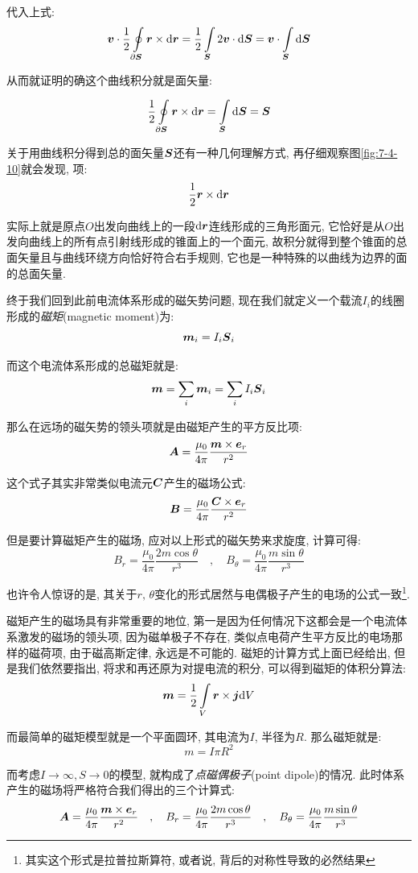 代入上式:
\[\boldsymbol{v}\cdot\frac{1}{2}\oint\limits_{\partial\boldsymbol{S}}\boldsymbol{r}\times \textrm{d} \boldsymbol{r}=\frac{1}{2}\int\limits_{\boldsymbol{S}}2\boldsymbol{v} \cdot \textrm{d} \boldsymbol{S}=\boldsymbol{v} \cdot\int\limits_{\boldsymbol{S}}\textrm{d} \boldsymbol{S}\]

从而就证明的确这个曲线积分就是面矢量:

\[\frac{1}{2}\oint\limits_{\partial\boldsymbol{S}}\boldsymbol{r}\times \textrm{d} \boldsymbol{r}=\int\limits_{\boldsymbol{S}}\textrm{d} \boldsymbol{S}=\boldsymbol{S}\]

关于用曲线积分得到总的面矢量$\boldsymbol{S}$还有一种几何理解方式, 再仔细观察图\ref{fig:7-4-10}就会发现, 项:
\[\frac{1}{2}\boldsymbol{r}\times \textrm{d} \boldsymbol{r}\]

实际上就是原点$O$出发向曲线上的一段$ \textrm{d} \boldsymbol{r}$连线形成的三角形面元, 它恰好是从$O$出发向曲线上的所有点引射线形成的锥面上的一个面元, 故积分就得到整个锥面的总面矢量且与曲线环绕方向恰好符合右手规则, 它也是一种特殊的以曲线为边界的面的总面矢量.

终于我们回到此前电流体系形成的磁矢势问题, 现在我们就定义一个载流$I_i$的线圈形成的\emph{磁矩}(magnetic moment)为:
\[\boldsymbol{m}_i=I_i\boldsymbol{S}_i\]

而这个电流体系形成的总磁矩就是:
\[\boldsymbol{m}=\sum_i \boldsymbol{m}_i=\sum_iI_i\boldsymbol{S}_i\]

那么在远场的磁矢势的领头项就是由磁矩产生的平方反比项:
\[\boldsymbol{A}=\frac{\mu_0}{4\pi}\frac{\boldsymbol{m}\times \boldsymbol{e}_r}{r^2}\]

这个式子其实非常类似电流元$\boldsymbol{C}$产生的磁场公式:
\[\boldsymbol{B}=\frac{\mu_0}{4\pi}\frac{\boldsymbol{C}\times \boldsymbol{e}_r}{r^2}\]

但是要计算磁矩产生的磁场, 应对以上形式的磁矢势来求旋度, 计算可得:
\[B_r=\frac{\mu_0}{4\pi}\frac{2m\cos\theta }{r^3}\quad ,\quad B_\theta=\frac{\mu_0}{4\pi}\frac{m\sin\theta }{r^3}\]

也许令人惊讶的是, 其关于$r,\,\theta$变化的形式居然与电偶极子产生的电场的公式一致\footnote{其实这个形式是拉普拉斯算符, 或者说, 背后的对称性导致的必然结果}.

磁矩产生的磁场具有非常重要的地位, 第一是因为任何情况下这都会是一个电流体系激发的磁场的领头项, 因为磁单极子不存在, 类似点电荷产生平方反比的电场那样的磁荷项, 由于磁高斯定律, 永远是不可能的. 磁矩的计算方式上面已经给出, 但是我们依然要指出, 将求和再还原为对提电流的积分, 可以得到磁矩的体积分算法:
\[\boldsymbol{m}=\frac{1}{2}\int\limits_V \boldsymbol{r}\times \boldsymbol{j}\textrm{d} V\]

而最简单的磁矩模型就是一个平面圆环, 其电流为$I$, 半径为$R$. 那么磁矩就是:
\[m=I\pi R^2\]

而考虑$I\to \infty, S\to 0$的模型, 就构成了\emph{点磁偶极子}(point dipole)的情况. 此时体系产生的磁场将严格符合我们得出的三个计算式:
\[\boldsymbol{A}=\frac{\mu_0}{4\pi}\frac{\boldsymbol{m}\times \boldsymbol{e}_r}{r^2}\quad ,\quad B_r=\frac{\mu_0}{4\pi}\frac{2m\cos\theta }{r^3}\quad ,\quad B_\theta=\frac{\mu_0}{4\pi}\frac{m\sin\theta }{r^3}\]

